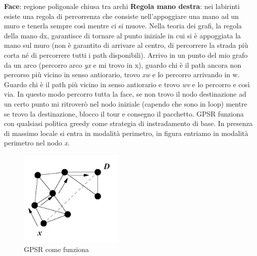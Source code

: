 \documentclass[12pt,italian]{report}
\begin{document}
\noindent \textbf{Face}: regione poligonale chiusa tra archi
\bigbreak
\noindent \textbf{Regola mano destra}: nei labirinti esiste una regola di percorrenza che consiste nell'appoggiare una mano ad un muro e tenerla sempre così mentre ci si muove. Nella teoria dei grafi, la regola della mano dx, garantisce di tornare al punto iniziale in cui si è appoggiata la mano sul muro (non è garantito di arrivare al centro, di percorrere la strada più corta né di percorrere tutti i path disponibili). 
\bigbreak
Arrivo in un punto del mio grafo da un arco (percorro arco \textit{yx} e mi trovo in x), guardo chi è il path ancora non percorso più vicino in senso antiorario, trovo \textit{xw} e lo percorro arrivando in w. Guardo chi è il path più vicino in senso antiorario e trovo \textit{wv} e lo percorro e così via.
In questo modo percorro tutta la face, se non trovo il nodo destinazione ad un certo punto mi ritroverò nel nodo iniziale (capendo che sono in loop) mentre se trovo la destinazione, blocco il tour e consegno il pacchetto. 
\bigbreak
GPSR funziona con qualsiasi politica greedy come strategia di instradamento di base. In presenza di massimo locale si entra in modalità perimetro, in figura entriamo in modalità perimetro nel nodo \textit{x}.
\begin{figure}[h]
\centering
\includegraphics[width=50mm]{img/gpsr3.PNG}
\caption{GPSR come funziona}
\label{fig:gpsrmodper}
\end{figure}
\newpage
\end{document}

